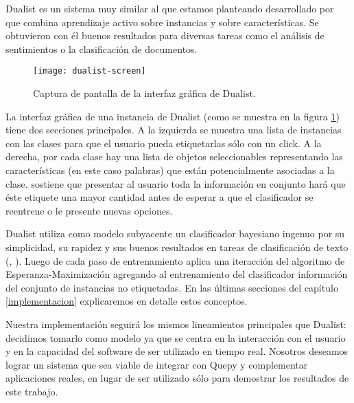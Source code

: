 Dualist es un sistema muy similar al que estamos planteando desarrollado por \citet{dualist} que combina aprendizaje activo sobre instancias y sobre características. Se obtuvieron con él buenos resultados para diversas tareas como el análisis de sentimientos o la clasificación de documentos.

\begin{figure}[h!]
\caption{Captura de pantalla de la interfaz gráfica de Dualist.}\label{figura-dualist}
\texttt{[image: dualist-screen]}
\centering
\end{figure}

La interfaz gráfica de una instancia de Dualist (como se muestra en la figura \ref{figura-dualist}) tiene dos secciones principales. A la izquierda se muestra una lista de instancias con las clases para que el usuario pueda etiquetarlas sólo con un click. A la derecha, por cada clase hay una lista de objetos seleccionables representando las características (en este caso palabras) que están potencialmente asociadas a la clase. \citet{dualist} sostiene que presentar al usuario toda la información en conjunto hará que éste etiquete una mayor cantidad antes de esperar a que el clasificador se reentrene o le presente nuevas opciones.

Dualist utiliza como modelo subyacente un clasificador bayesiano ingenuo por su simplicidad, su rapidez y sus buenos resultados en tareas de clasificación de texto (\citet{multinomialnb-comparision-mccallum}, \citet{tackling-mnb}). Luego de cada paso de entrenamiento aplica una iteracción del algoritmo de Esperanza-Maximización agregando al entrenamiento del clasificador información del conjunto de instancias no etiquetadas. En las últimas secciones del capítulo \ref{implementacion} explicaremos en detalle estos conceptos.

Nuestra implementación seguirá los mismos lineamientos principales que Dualist: decidimos tomarlo como modelo ya que se centra en la interacción con el usuario y en la capacidad del software de ser utilizado en tiempo real. Nosotros deseamos lograr un sistema que sea viable de integrar con Quepy y complementar aplicaciones reales, en lugar de ser utilizado sólo para demostrar los resultados de este trabajo.

